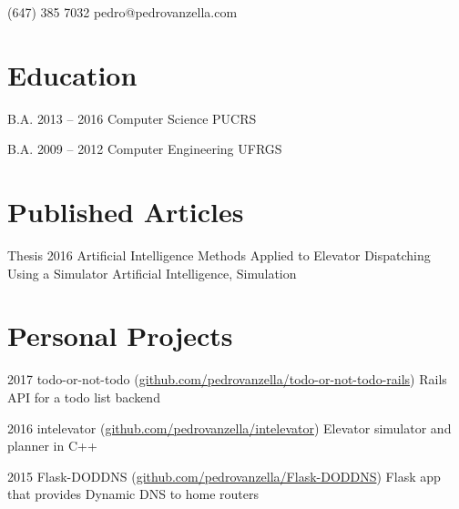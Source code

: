 \documentclass{tccv}
\begin{document}
    {(647) 385 7032}
    {pedro@pedrovanzella.com}

\section{Education}

\begin{yearlist}

\item[B.A.]{2013 -- 2016}
     {Computer Science}
     {PUCRS}

\item[B.A.]{2009 -- 2012}
     {Computer Engineering}
     {UFRGS}

\end{yearlist}

\section{Published Articles}
\begin{yearlist}
  \item[Thesis]{2016}
    {Artificial Intelligence Methods Applied to Elevator Dispatching Using a Simulator}
    {Artificial Intelligence, Simulation}
\end{yearlist}

\section{Personal Projects}

\begin{yearlist}

\item{2017}
  {todo-or-not-todo \newline (\href{https://github.com/pedrovanzella/todo-or-not-todo-rails}{github.com/pedrovanzella/todo-or-not-todo-rails})}
  {Rails API for a todo list backend}

\item{2016}
  {intelevator \newline (\href{https://github.com/vantas/intelevator}{github.com/pedrovanzella/intelevator})}
  {Elevator simulator and planner in C++}
  
\item{2015}
     {Flask-DODDNS \newline (\href{https://github.com/pedrovanzella/Flask-DODDNS}{github.com/pedrovanzella/Flask-DODDNS})}
     {Flask app that provides Dynamic DNS to home routers}

\end{yearlist}
\end{document}
